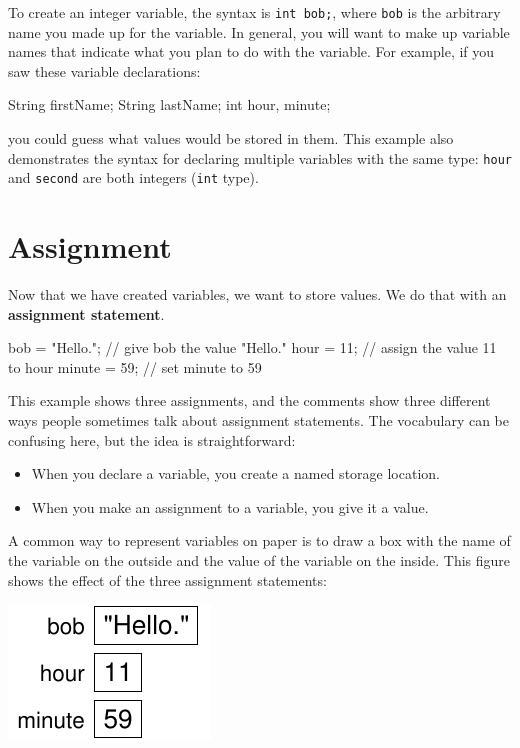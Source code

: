 To create an integer variable, the syntax is {\tt int bob;},
where {\tt bob} is the arbitrary name you made up for the
variable.  In general, you will want to make up variable names
that indicate what you plan to do with the variable.  For
example, if you saw these variable declarations:

\begin{code}
    String firstName;
    String lastName;
    int hour, minute;
\end{code}
%
you could guess what values
would be stored in them.  This example
also demonstrates the syntax for declaring multiple variables
with the same type: {\tt hour} and {\tt second}
are both integers ({\tt int} type).

\section{Assignment}

Now that we have created variables, we want to
store values.  We do that with an {\bf assignment
statement}.

\begin{code}
    bob = "Hello.";      // give bob the value "Hello."
    hour = 11;           // assign the value 11 to hour
    minute = 59;         // set minute to 59
\end{code}
%
This example shows three assignments, and the comments show
three different ways people sometimes talk about assignment
statements.  The vocabulary can be confusing here, but the
idea is straightforward:

\begin{itemize}

\item When you declare a variable, you create a named storage location.

\item When you make an assignment to a variable, you give it a value.

\end{itemize}

A common way to represent variables on paper is to draw a box
with the name of the variable on the outside and the value
of the variable on the inside.  This figure shows
the effect of the three assignment statements:


\includegraphics{assign.pdf}



